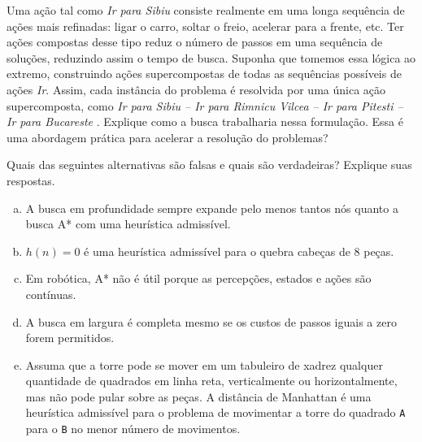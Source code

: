\begin{exercise}
Uma ação tal como \textit{Ir para Sibiu} consiste realmente em uma longa sequência de ações mais refinadas: ligar o carro, soltar o freio, acelerar para a frente, etc. Ter ações compostas desse tipo reduz o número de passos em uma sequência de soluções, reduzindo assim o tempo de busca. Suponha que tomemos essa lógica ao extremo, construindo ações supercompostas de todas as sequências possíveis de ações \textit{Ir}. Assim, cada instância do problema é resolvida por uma única ação supercomposta, como \textit{Ir para Sibiu -- Ir para Rimnicu Vilcea -- Ir para Pitesti -- Ir para Bucareste} . Explique como a busca trabalharia nessa formulação. Essa é uma abordagem prática para acelerar a resolução do problemas?
\end{exercise}

\begin{exercise}
Quais das seguintes alternativas são falsas e quais são verdadeiras? Explique suas respostas.

\begin{enumerate}[a.]
	\item A busca em profundidade sempre expande pelo menos tantos nós quanto a busca A* com uma heurística admissível.
	
	\item $h(n) = 0$ é uma heurística admissível para o quebra cabeças de 8 peças.
	
	\item Em robótica, A* não é útil porque as percepções, estados e ações são contínuas.
	
	\item A busca em largura é completa mesmo se os custos de passos iguais a zero forem permitidos.
	
	\item Assuma que a torre pode se mover em um tabuleiro de xadrez qualquer quantidade de quadrados em linha reta, verticalmente ou horizontalmente, mas não pode pular sobre as peças. A distância de Manhattan é uma heurística admissível para o problema de movimentar a torre do quadrado \texttt{A} para o \texttt{B} no menor número de movimentos.
\end{enumerate}
\end{exercise}

